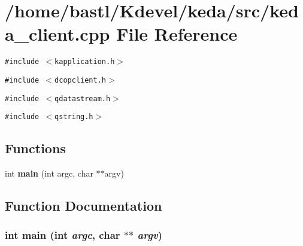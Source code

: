 \section{/home/bastl/Kdevel/keda/src/keda\_\-client.cpp File Reference}
\label{keda__client_8cpp}
{\tt \#include $<$kapplication.h$>$}\par
{\tt \#include $<$dcopclient.h$>$}\par
{\tt \#include $<$qdatastream.h$>$}\par
{\tt \#include $<$qstring.h$>$}\par
\subsection*{Functions}
\begin{CompactItemize}
\item 
int {\bf main} (int argc, char $\ast$$\ast$argv)
\end{CompactItemize}


\subsection{Function Documentation}
\subsubsection{\setlength{\rightskip}{0pt plus 5cm}int main (int {\em argc}, char $\ast$$\ast$ {\em argv})}\label{keda__client_8cpp_30c4c19ff69d905e8e4c750b3af23485}



